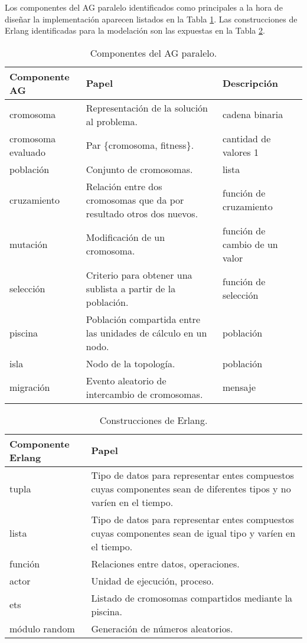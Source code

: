 \documentclass[runningheads]{llncs}
\begin{document}
Los componentes del AG paralelo identificados como principales a la hora de diseñar la implementación aparecen listados en la Tabla \ref{agpComp}. Las construcciones de Erlang identificadas para la modelación son las expuestas en la Tabla \ref{erlComp}.


\begin{table}
  \centering
   \begin{tabular}{|p{3.2cm}|p{5cm}|p{3cm}|}
   \hline
   \textbf{Componente AG} & \textbf{Papel} & \textbf{Descripción}\\
     \hline
      cromosoma & Representación de la solución al problema. & cadena binaria \\
     \hline
      cromosoma evaluado & Par \{cromosoma, fitness\}. & cantidad de valores 1\\
     \hline
      población & Conjunto de cromosomas. & lista\\
     \hline
     cruzamiento & Relación entre dos cromosomas que da por resultado otros dos nuevos. & función de cruzamiento\\
     \hline
      mutación & Modificación de un cromosoma.& función de cambio de un valor\\
     \hline
     selección & Criterio para obtener una sublista a partir de la población. & función de selección\\
     \hline
      piscina & Población compartida entre las unidades de cálculo en un nodo. & población\\
     \hline
      isla & Nodo de la topología. & población\\
     \hline
      migración & Evento aleatorio de intercambio de cromosomas. & mensaje\\
     \hline
   \end{tabular}
  \caption{Componentes del AG paralelo.}\label{agpComp}
\end{table}

\begin{table}
  \centering
\begin{tabular}{|p{3.4cm}|p{7cm}|}
  \hline
  \textbf{Componente Erlang} & \textbf{Papel} \\
     \hline
  tupla & Tipo de datos para representar entes compuestos cuyas componentes sean de diferentes tipos y no varíen en el tiempo. \\
     \hline
  lista & Tipo de datos para representar entes compuestos cuyas componentes sean de igual tipo y varíen en el tiempo. \\
     \hline
  función & Relaciones entre datos, operaciones. \\
     \hline
  actor & Unidad de ejecución, proceso. \\
     \hline
  ets & Listado de cromosomas compartidos mediante la piscina. \\
     \hline
  módulo random & Generación de números aleatorios. \\
  \hline
\end{tabular}
  \caption{Construcciones de Erlang.}\label{erlComp}
\end{table}
\end{document}
